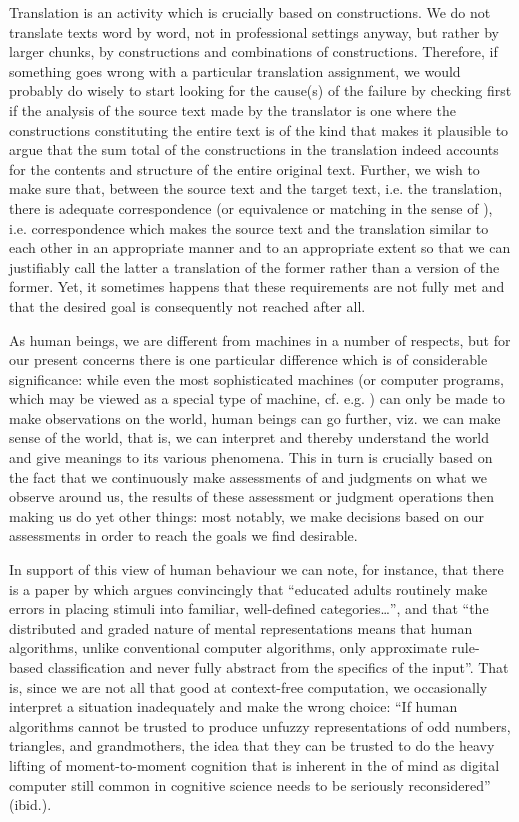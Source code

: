 \documentclass[output=paper]{LSP/langsci}
\begin{document}
Translation is an activity which is crucially based on constructions. We do not translate texts word by word, not in professional settings anyway, but rather by larger chunks, by constructions and combinations of constructions. Therefore, if something goes wrong with a particular translation assignment, we would probably do wisely to start looking for the cause(s) of the failure by checking first if the analysis of the source text made by the translator is one where the constructions constituting the entire text is of the kind that makes it plausible to argue that the sum total of the constructions in the translation indeed accounts for the contents and structure of the entire original text. Further, we wish to make sure that, between the source text and the target text, i.e. the translation, there is adequate correspondence (or equivalence or matching in the sense of \citealt{Holmes1988}), i.e. correspondence which makes the source text and the translation similar to each other in an appropriate manner and to an appropriate extent so that we can justifiably call the latter a translation of the former rather than a version of the former. Yet, it sometimes happens that these requirements are not fully met and that the desired goal is consequently not reached after all.

 
  As human beings, we are different from machines in a number of respects, but for our present concerns there is one particular difference which is of considerable significance: while even the most sophisticated machines (or computer programs, which may be viewed as a special type of machine, cf. e.g. \citealt{rammert2008}) can only be made to make observations on the world, human beings can go further, viz. we can make sense of the world, that is, we can interpret and thereby understand the world and give meanings to its various phenomena. This in turn is crucially based on the fact that we continuously make assessments of and judgments on what we observe around us, the results of these assessment or judgment operations then making us do yet other things: most notably, we make decisions based on our assessments in order to reach the goals we find desirable.

  In support of this view of human behaviour we can note, for instance, that there is a paper by \citet[615]{Lupyan2013} which argues convincingly that ``educated adults routinely make errors in placing stimuli into familiar, well-defined categories\ldots'', and that ``the distributed and graded nature of mental representations means that human algorithms, unlike conventional computer algorithms, only approximate rule-based classification and never fully abstract from the specifics of the input''. That is, since we are not all that good at context-free computation, we occasionally interpret a situation inadequately and make the wrong choice: ``If human algorithms cannot be trusted to produce unfuzzy representations of odd numbers, triangles, and grandmothers, the idea that they can be trusted to do the heavy lifting of moment-to-moment cognition that is inherent in the  of mind as digital computer still common in cognitive science needs to be seriously reconsidered'' (ibid.).
\end{document}
